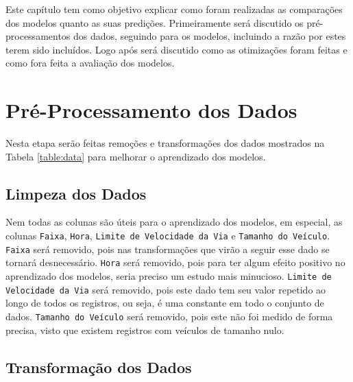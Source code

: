



Este capítulo tem como objetivo explicar como foram realizadas as comparações dos modelos quanto as suas predições. Primeiramente será discutido os pré-processamentos dos dados, seguindo para os modelos, incluindo a razão por estes terem sido incluídos. Logo após será discutido como as otimizações foram feitas e como fora feita a avaliação dos modelos.

\section{Pré-Processamento dos Dados}

Nesta etapa serão feitas remoções e transformações dos dados mostrados na Tabela \ref{table:data} para melhorar o aprendizado dos modelos.

\subsection{Limpeza dos Dados}

Nem todas as colunas são úteis para o aprendizado dos modelos, em especial, as colunas \texttt{Faixa}, \texttt{Hora}, \texttt{Limite de Velocidade da Via} e \texttt{Tamanho do Veículo}. \texttt{Faixa} será removido, pois nas transformações que virão a seguir esse dado se tornará desnecessário. \texttt{Hora} será removido, pois para ter algum efeito positivo no aprendizado dos modelos, seria preciso um estudo mais minucioso. \texttt{Limite de Velocidade da Via} será removido, pois este dado tem seu valor repetido ao longo de todos os registros, ou seja, é uma constante em todo o conjunto de dados. \texttt{Tamanho do Veículo} será removido, pois este não foi medido de forma precisa, visto que existem registros com veículos de tamanho nulo.


\subsection{Transformação dos Dados}



